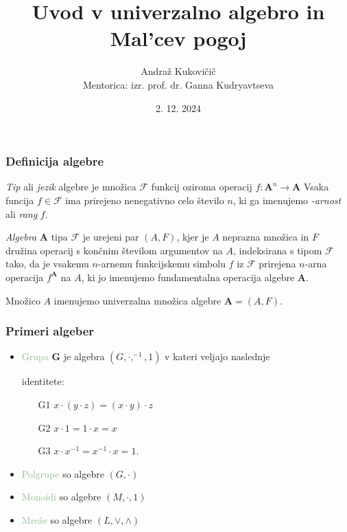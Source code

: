 \documentclass{beamer}
\title{Uvod v univerzalno algebro in Mal'cev pogoj}
\author{Andraž Kukovičič \\ {\small Mentorica: izr. prof. dr. Ganna Kudryavtseva \\}}
\institute{Fakulteta za matematiko in fiziko}
\date{2. 12. 2024}
\newcommand{\FF}{$\mathcal{F}$ }
\begin{document}
\frame{\titlepage}

\begin{frame}
\frametitle{Definicija algebre}

\emph{Tip} ali \emph{jezik} algebre je množica $\mathcal{F}$ funkcij oziroma operacij $f:\mathbf{A}^n \rightarrow \mathbf{A}$
Vsaka funcija $f \in 
\mathcal{F}$ ima prirejeno nenegativno celo število $n$, ki ga imenujemo \emph{-arnost} ali 
\emph{rang} $f$. \\
\pause
\begin{block}{}

\emph{Algebra} $\mathbf{A}$ tipa $\mathcal{F}$ je urejeni par $ \left(A, F\right)$, kjer je $A$ neprazna množica 
in $F$ družina operacij s končnim številom argumentov na $A$, indeksirana s tipom \FF tako, 
da je vsakemu $n$-arnemu funkcijskemu simbolu $f$ iz \FF prirejena $n$-arna operacija $f^\mathbf{A}$ 
na $A$, ki jo imenujemo fundamentalna operacija algebre $\mathbf{A}$. \\

\end{block}
\pause
Množico $A$ imenujemo univerzalna množica algebre $\mathbf{A}  = \left(A, F\right)$. \\
\end{frame}

\begin{frame}
    \frametitle{Primeri algeber}
    \begin{itemize}
        \item \textcolor{darkseagreen}{Grupa} $\mathbf{G}$ je algebra $\left(G, \cdot, ^{-1}, 1\right)$ v kateri veljajo naslednje
        \item[] identitete:
        \begin{itemize}
            \item[G1] $x \cdot \left(y \cdot z\right) = \left(x \cdot y\right) \cdot z$
            \item[G2] $x \cdot 1 = 1 \cdot x = x$
            \item[G3] $x \cdot x^{-1} = x^{-1} \cdot x = 1$.
        \end{itemize}
    \pause
        \item \textcolor{darkseagreen}{Polgrupe} so algebre $\left(G, \cdot\right)$
        \item \textcolor{darkseagreen}{Monoidi} so algebre  $\left(M, \cdot, 1\right)$
        \item \textcolor{darkseagreen}{Mreže} so algebre $\left(L,\vee, \wedge\right)$ 
    \end{itemize}
\end{frame}
\end{document}
